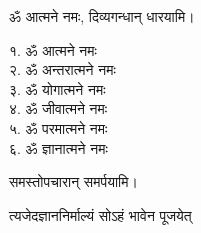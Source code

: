 ॐ आत्मने नमः, दिव्यगन्धान् धारयामि।
\begin{multicols}{2}
१. ॐ आत्मने नमः\\
२. ॐ अन्तरात्मने नमः\\
३. ॐ योगात्मने नमः\\
४. ॐ जीवात्मने नमः\\
५. ॐ परमात्मने नमः\\
६. ॐ ज्ञानात्मने नमः
\end{multicols}
समस्तोपचारान् समर्पयामि।

{त्यजेदज्ञाननिर्माल्यं सोऽहं भावेन पूजयेत्}
